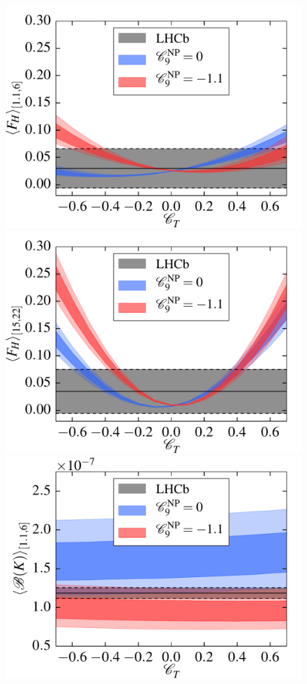 \documentclass[twocolumn,epjc3]{svjour3}
\numberwithin{equation}{section}
\renewcommand{\[}{\big[}
\renewcommand{\]}{\big]}
\renewcommand{\(}{\big(}
\renewcommand{\)}{\big)}
\newlength{\relwidth}
\begin{document}
\begin{figure}
  \setlength{\relwidth}{0.33\textwidth}
  \begin{center}
    \includegraphics[width=\relwidth]{plots/pdf/ct_K_FH1dot1to6}
    \includegraphics[width=\relwidth]{plots/pdf/ct_K_FH15to22}
    \\
    \includegraphics[width=\relwidth]{plots/pdf/ct_K_BR1dot1to6}

\end{center}
\end{figure}
\end{document}
